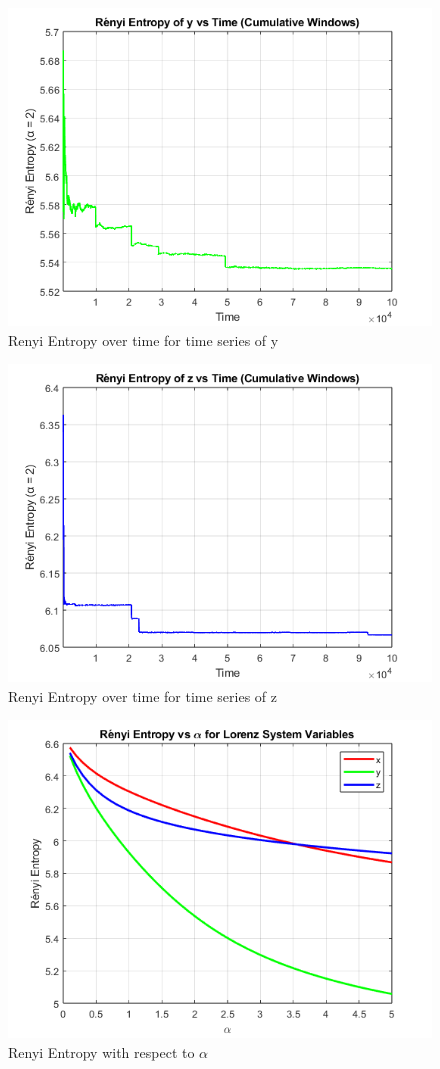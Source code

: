 \documentclass[%
reprint,
amsmath,amssymb,
aps,
floatfix,
]{revtex4-2}
\begin{document}
			\begin{figure}[htbp]
		\centering
		\includegraphics[width=0.8\linewidth]{RE_vs_time_y.png}
		\caption{Renyi Entropy over time for time series of y}
		\label{fig:Renyi Entropy}
	\end{figure}
			\begin{figure}[htbp]
		\centering
		\includegraphics[width=0.8\linewidth]{RE_vs_time_z.png}
		\caption{Renyi Entropy over time for time series of z}
		\label{fig:Renyi Entropy}
	\end{figure}
			\begin{figure}[htbp]
		\centering
		\includegraphics[width=0.8\linewidth]{renyi_entropy_vs_alpha_for_100_bin.png}
		\caption{Renyi Entropy with respect to $\alpha$}
		\label{fig:Renyi Entropy}
	\end{figure}
\end{document}
